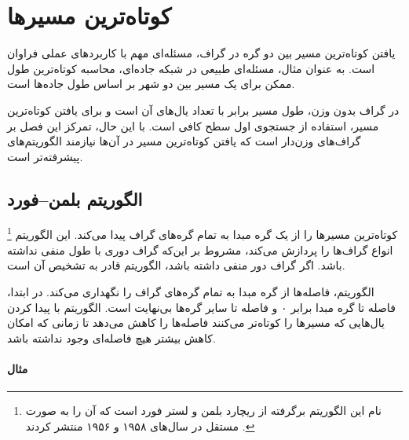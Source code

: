 \chapter{کوتاه‌ترین مسیرها}


یافتن کوتاه‌ترین مسیر بین دو گره در گراف، مسئله‌ای مهم با کاربردهای عملی فراوان است.
به عنوان مثال، مسئله‌ای طبیعی در شبکه جاده‌ای، محاسبه کوتاه‌ترین طول ممکن برای یک مسیر بین دو شهر بر اساس طول جاده‌ها است.

در گراف بدون وزن، طول مسیر برابر با تعداد یال‌های آن است و برای یافتن کوتاه‌ترین مسیر، استفاده از جستجوی اول سطح کافی است.
با این حال، تمرکز این فصل بر گراف‌های وزن‌دار است که یافتن کوتاه‌ترین مسیر در آن‌ها نیازمند الگوریتم‌های پیشرفته‌تر است.

\section{الگوریتم بلمن–فورد}


\footnote{نام این الگوریتم برگرفته از ریچارد بلمن و لستر فورد است که آن را به صورت مستقل در سال‌های ۱۹۵۸ و ۱۹۵۶ منتشر کردند \cite{bel58,for56a}.} کوتاه‌ترین مسیرها را از یک گره مبدا به تمام گره‌های گراف پیدا می‌کند.
این الگوریتم انواع گراف‌ها را پردازش می‌کند، مشروط بر این‌که گراف دوری با طول منفی نداشته باشد.
اگر گراف دور منفی داشته باشد، الگوریتم قادر به تشخیص آن است.

الگوریتم، فاصله‌ها از گره مبدا به تمام گره‌های گراف را نگهداری می‌کند.
در ابتدا، فاصله تا گره مبدا برابر ۰ و فاصله تا سایر گره‌ها بی‌نهایت است.
الگوریتم با پیدا کردن یال‌هایی که مسیرها را کوتاه‌تر می‌کنند فاصله‌ها را کاهش می‌دهد تا زمانی که امکان کاهش بیشتر هیچ فاصله‌ای وجود نداشته باشد.

\subsubsection{مثال}

